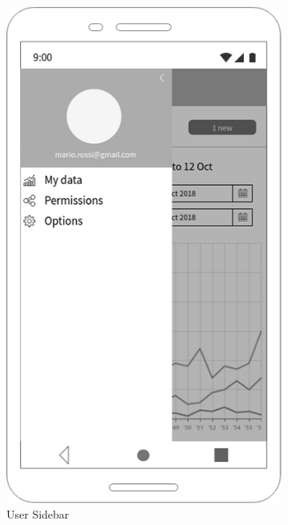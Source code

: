 \begin{figure}[h!]
 \centering
  \begin{subfigure}[b]{0.4\linewidth}
    \includegraphics[width=\linewidth]{img/mockup/u_sidebar.jpg}
    \caption{User Sidebar}
  \end{subfigure}
 ~ ~ ~ ~ ~ ~ 
  \begin{subfigure}[b]{0.4\linewidth}

\end{subfigure}
\end{figure}
